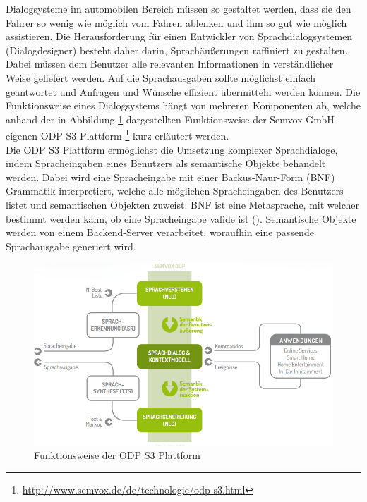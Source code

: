 \documentclass[12pt,a4paper]{scrartcl}
\begin{document}
Dialogsysteme im automobilen Bereich müssen so gestaltet werden, dass sie den Fahrer so wenig wie möglich vom Fahren ablenken und ihm so gut wie möglich assistieren. Die Herausforderung für einen Entwickler von Sprachdialogsystemen (Dialogdesigner) besteht daher darin, Sprachäußerungen raffiniert zu gestalten. Dabei müssen dem Benutzer alle relevanten Informationen in verständlicher Weise geliefert werden. Auf die Sprachausgaben sollte möglichst einfach geantwortet und Anfragen und Wünsche effizient übermitteln werden können. Die Funktionsweise eines Dialogsystems hängt von mehreren Komponenten ab, welche anhand der in Abbildung \ref{odps3} dargestellten Funktionsweise der Semvox GmbH eigenen ODP S3 Plattform \footnote{\label{foot:odps3}\url{http://www.semvox.de/de/technologie/odp-s3.html}} kurz erläutert werden. \\
Die ODP S3 Plattform ermöglichst die Umsetzung komplexer Sprachdialoge, indem Spracheingaben eines Benutzers als semantische Objekte behandelt werden. Dabei wird eine Spracheingabe mit einer Backus-Naur-Form (BNF) Grammatik interpretiert, welche alle möglichen Spracheingaben des Benutzers listet und semantischen Objekten zuweist. BNF ist eine Metasprache, mit welcher bestimmt werden kann, ob eine Spracheingabe valide ist (\cite{BNFref}). Semantische Objekte werden von einem Backend-Server verarbeitet, woraufhin eine passende Sprachausgabe generiert wird. 
\begin{figure}[H]
\begin{center}
\includegraphics[width=12cm]{odps3.png}
\caption{Funktionsweise der ODP S3 Plattform}
\label{odps3}
\end{center}
\end{figure}
\end{document}
